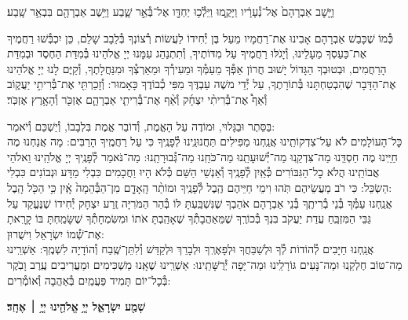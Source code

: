 \documentclass[twoside, openany, parskip=half, 11pt]{book}
\begin{document}
וַיָּ֤שׇׁב אַבְרָהָם֙ אֶל־נְ֯עָרָ֔יו וַיָּקֻ֛מוּ וַיֵּלְ֯כ֥וּ יַחְדָּ֖ו אֶל־בְּ֯אֵ֣ר שָׁ֑בַע וַיֵּ֥שֶׁב אַבְרָהָ֖ם בִּבְאֵ֥ר שָֽׁבַע׃

כְּ֯מוֹ שֶׁכָּבַשׁ אַבְרָהָם אָבִינוּ אֶת־רַחֲמָיו מֵעַל בֶּן יְ֯חִידוֹ לַעֲשׂוֹת רְ֯צוֹנְךָ בְּ֯לֵבָב שָׁלֵם, כֵּן יִכְבְּ֯שׁוּ רַחֲמֶיךָ אֶת־כַּעַסְךָ מֵעָלֵינוּ, וְ֯יָגֹלּוּ רַחֲמֶיךָ עַל מִדּוֹתֶיךָ, וְ֯תִתְנַהֵג עִמָּנוּ יְיָ אֱלֹהֵינוּ בְּ֯מִדַּת הַחֶסֶד וּבְמִדַּת הָרַחֲמִים, וּבְטוּבְךָ הַגָּדוֹל יָשׁוּב חֲרוֹן אַפְּ֯ךָ מֵעַמְּ֯ךָ וּמֵעִירְ֯ךָ וּמֵאַרְצְ֯ךָ וּמִנַּחֲלָתֶךָ, וְ֯קַיֶּם לָנוּ יְיָ אֱלֹהֵינוּ אֶת־הַדָּבָר שֶׁהִבְטַחְתָּנוּ בְּ֯תוֹרָתֶךָ, עַל יְ֯דֵי משֶׁה עַבְדֶּךָ מִפִּי כְ֯בוֹדֶךָ כָּאָמוּר: וְ֯זָכַרְתִּ֖י אֶת־בְּ֯רִיתִ֣י יַעֲק֑וֹב וְ֯אַף֩ אֶת־בְּ֯רִיתִ֨י יִצְחָ֜ק וְ֯אַ֨ף אֶת־בְּ֯רִיתִ֧י אַבְרָהָ֛ם אֶזְכֹּ֖ר וְ֯הָאָ֥רֶץ אֶזְכֹּֽר׃

בַּסֵּתֶר וּבַגָּלוּי, וּמוֹדֶה עַל הָאֱמֶת, וְ֯דוֹבֵר אֱמֶת בִּלְבָבוֹ, וְ֯יַשְׁכֵּם וְ֯יֹאמַר: \\
כׇּל־הָעוֹלָמִים לֹא עַל־צִדְקוֹתֵֽינוּ אֲנַֽחְנוּ מַפִּילִים תַּחֲנוּנֵֽינוּ לְ֯פָנֶֽיךָ כִּי עַל רַחֲמֶֽיךָ הָרַבִּים: מָה אֲנַחְנוּ מֶה חַיֵּֽינוּ מֶה חַסְדֵּֽנוּ מַה־צִּדְקֵֽנוּ מַה־יְּ֯שׁוּעָתֵֽנוּ מַה־כֹּחֵֽנוּ מַה־גְּ֯בוּרָתֵֽנוּ: מַה־נֹּאמַר לְ֯פָנֶֽיךָ יְיָ אֱלֹהֵֽינוּ וֵאלֹהֵי אֲבוֹתֵֽינוּ הֲלֹא כׇל־הַגִּבּוֹרִים כְּ֯אַֽיִן לְ֯פָנֶֽיךָ וְ֯אַנְשֵׁי הַשֵּׁם כְּ֯לֹא הָיוּ וַחֲכָמִים כִּבְלִי מַדָּע וּנְבוֹנִים כִּבְלִי הַשְׂכֵּל: כִּי רֹב מַעֲשֵׂיהֶם תֹּֽהוּ וִימֵי חַיֵּיהֶם הֶֽבֶל לְ֯פָנֶֽיךָ וּמוֹתַ֨ר הָֽאָדָ֤ם מִן־הַבְּ֯הֵמָה֙ אָֽ֔יִן כִּ֥י הַכֹּ֖ל הָֽבֶל: \\
אֲנַֽחְנוּ עַמְּ֯ךָ בְּ֯נֵי בְ֯רִיתֶֽךָ בְּ֯נֵי אַבְרָהָם אֹהַבְךָ שֶׁנִּשְׁבַּֽעְתָּ לּוֹ בְּ֯הַר הַמֹּרִיָּה זֶֽרַע יִצְחָק יְ֯חִידוֹ שֶׁנֶּעֱקַד עַל גַּבֵּי הַמִּזְבֵּֽחַ עֲדַת יַעֲקֹב בִּנְךָ בְּ֯כוֹרֶֽךָ שֶׁמֵּאַהֲבָתְ֯ךָ שֶׁאָהַֽבְתָּ אֹתוֹ וּמִשִּׂמְחָתְ֯ךָ שֶׁשָּׂמַֽחְתָּ בּוֹ קָרָֽאתָ אֶת־שְׁ֯מוֹ יִשְׂרָאֵל וִישֻׁרוּן: \\
אֲנַֽחְנוּ חַיָּבִים לְ֯הוֹדוֹת לְ֯ךָ וּלְשַׁבֵּחֲךָ וּלְפָאֶרְֽךָ וּלְבָרֵךְ וּלְקַדֵּשׁ וְ֯לִתֵּן־שֶֽׁבַח וְ֯הוֹדָיָה לִשְׁמֶֽךָ: אַשְׁרֵֽינוּ מַה־טּוֹב חֶלְקֵֽנוּ וּמַה־נָּעִים גּוֹרָלֵֽינוּ וּמַה־יָּפָה יְ֯רֻשָּׁתֵֽינוּ: אַשְׁרֵֽינוּ שֶׁאָֽנוּ מַשְׁכִּימִים וּמַעֲרִיבִים עֶֽרֶב וָבֹֽקֶר בְּ֯כׇל־יוֹם תָּמִיד פַּעֲמַֽיִם בְּ֯אַהֲבָה וְ֯אוֹמְ֯רִים:

\begin{Large}
\textbf{שְׁמַ֖ע יִשְׂרָאֵ֑ל יְיָ֥ אֱלֹהֵ֖ינוּ יְיָ֥ ׀ אֶחָֽד׃}
\end{Large}
\end{document}
